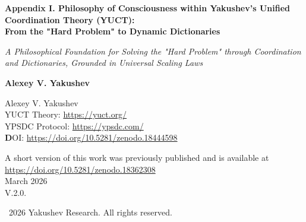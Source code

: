 \documentclass[12pt,a4paper]{article}
\begin{document}
	
	\begin{titlepage}
		\begin{center}
			\vspace*{0cm}
			
			\Huge\textbf{Appendix I. Philosophy of Consciousness within Yakushev's Unified Coordination Theory (YUCT):\\ From the "Hard Problem" to Dynamic Dictionaries}
			
			\vspace{1cm}
			
			\small\textit{A Philosophical Foundation for Solving the "Hard Problem" through Coordination and Dictionaries, Grounded in Universal Scaling Laws}
			
			\vspace{0.5cm}
			
			\small\textbf{Alexey V. Yakushev}
			
			\vspace{1cm}
			\Large
			Alexey V. Yakushev\\
			
	YUCT Theory: \url{https://yuct.org/}\\
YPSDC Protocol: \url{https://ypsdc.com/}\\


\vspace{2cm}
\textbf DOI: \url{https://doi.org/10.5281/zenodo.18444598}\\

\vspace{1cm}

\vspace{0cm}
\large 
A short version of this work was previously published and is available at\\ \url{https://doi.org/10.5281/zenodo.18362308}\\
\vspace{1cm}
March 2026 \\ \large V.2.0.
			
			\vspace{6cm}
			\textcopyright~2026 Yakushev Research. All rights reserved.
			
			\newpage
			
			\begin{abstract}
				\noindent
				This article provides a philosophical foundation for solving the "hard problem of consciousness" within the framework of the Unified Coordination Theory (YUCT). Consciousness is understood not as an epiphenomenon or illusion, but as a \textbf{dynamic coordination process} implemented through a hierarchy of \textbf{internal dictionaries}. We show that the classical "brain–consciousness" dualism is overcome through a three-level model: \textbf{genetic}, \textbf{neural}, and \textbf{cultural dictionaries}. Subjective experience is interpreted as the result of \textbf{live coordination} between neural ensembles using shared semantic spaces. The meta-dictionary (the ability to reflect on one's own states) explains the phenomenon of selfhood. 
				

\end{abstract}
\end{center}
\end{titlepage}
\end{document}
